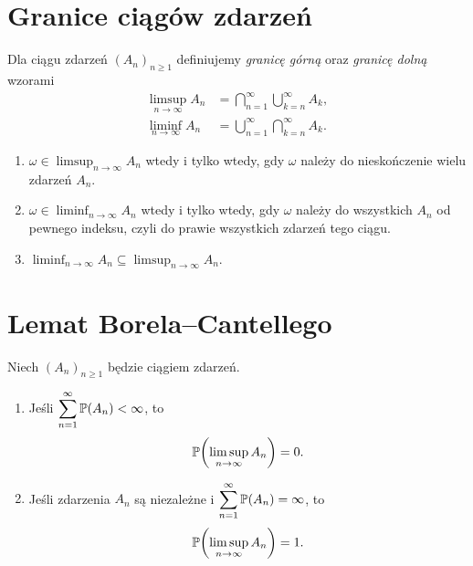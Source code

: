 \section{Granice ciągów zdarzeń}
\label{sec:granice-zdarzen}

\begin{definicja}
\label{def:granice-zdarzen}
Dla ciągu zdarzeń $(A_n)_{n\geq1}$ definiujemy \emph{granicę górną}
oraz \emph{granicę dolną} wzorami
\begin{align}
  \limsup_{n\to\infty}A_n
    &=\bigcap_{n=1}^{\infty}\bigcup_{k=n}^{\infty}A_k,
    \label{eq:limsup-zdarzen}\\
  \liminf_{n\to\infty}A_n
    &=\bigcup_{n=1}^{\infty}\bigcap_{k=n}^{\infty}A_k.
    \label{eq:liminf-zdarzen}
\end{align}
\end{definicja}

\begin{fakt}
\label{fakt:interpretacja-granic}
\leavevmode
\begin{enumerate}
  \item $\omega\in\limsup_{n\to\infty}A_n$ wtedy i tylko wtedy,
    gdy $\omega$ należy do nieskończenie wielu zdarzeń $A_n$.
  \item $\omega\in\liminf_{n\to\infty}A_n$ wtedy i tylko wtedy,
    gdy $\omega$ należy do wszystkich $A_n$ od pewnego indeksu,
    czyli do prawie wszystkich zdarzeń tego ciągu.
  \item $\displaystyle\liminf_{n\to\infty}A_n
    \subseteq\limsup_{n\to\infty}A_n$.
\end{enumerate}
\end{fakt}

\section{Lemat Borela--Cantellego}
\label{sec:borel-cantelli}

\begin{lemat}
\label{lem:borel-cantelli}
Niech $(A_n)_{n\geq1}$ będzie ciągiem zdarzeń.
\begin{enumerate}
  \item Jeśli $\displaystyle\sum_{n=1}^{\infty}\mathbb{P}(A_n)<\infty$, to
    \[
      \mathbb{P}\!\left(\limsup_{n\to\infty}A_n\right)=0.
    \]
  \item Jeśli zdarzenia $A_n$ są niezależne i
    $\displaystyle\sum_{n=1}^{\infty}\mathbb{P}(A_n)=\infty$, to
    \[
      \mathbb{P}\!\left(\limsup_{n\to\infty}A_n\right)=1.
    \]
\end{enumerate}
\end{lemat}

